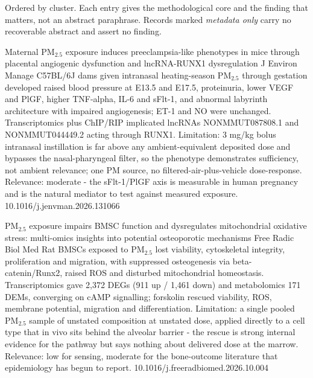 \documentclass[10pt]{article}
\begin{document}
{\fontsize{7.4}{9}\selectfont\color{Slate}Ordered by cluster. Each entry gives the
methodological core and the finding that matters, not an abstract paraphrase. Records
marked \textit{metadata only} carry no recoverable abstract and assert no finding.\par}


{Maternal PM$_{2.5}$ exposure induces preeclampsia-like phenotypes in mice through placental angiogenic dysfunction and lncRNA-RUNX1 dysregulation}
{J Environ Manage}
{C57BL/6J dams given intranasal heating-season PM$_{2.5}$ through gestation developed raised blood pressure at E13.5 and E17.5, proteinuria, lower VEGF and PlGF, higher TNF-alpha, IL-6 and sFlt-1, and abnormal labyrinth architecture with impaired angiogenesis; ET-1 and NO were unchanged. Transcriptomics plus ChIP/RIP implicated lncRNAs NONMMUT087808.1 and NONMMUT044449.2 acting through RUNX1. Limitation: 3 mg/kg bolus intranasal instillation is far above any ambient-equivalent deposited dose and bypasses the nasal-pharyngeal filter, so the phenotype demonstrates sufficiency, not ambient relevance; one PM source, no filtered-air-plus-vehicle dose-response. Relevance: moderate - the sFlt-1/PlGF axis is measurable in human pregnancy and is the natural mediator to test against measured exposure.}
{10.1016/j.jenvman.2026.131066}

\par{}\baselineskip{}\baselineskip
{}

{PM$_{2.5}$ exposure impairs BMSC function and dysregulates mitochondrial oxidative stress: multi-omics insights into potential osteoporotic mechanisms}
{Free Radic Biol Med}
{Rat BMSCs exposed to PM$_{2.5}$ lost viability, cytoskeletal integrity, proliferation and migration, with suppressed osteogenesis via beta-catenin/Runx2, raised ROS and disturbed mitochondrial homeostasis. Transcriptomics gave 2,372 DEGs (911 up / 1,461 down) and metabolomics 171 DEMs, converging on cAMP signalling; forskolin rescued viability, ROS, membrane potential, migration and differentiation. Limitation: a single pooled PM$_{2.5}$ sample of unstated composition at unstated dose, applied directly to a cell type that in vivo sits behind the alveolar barrier - the rescue is strong internal evidence for the pathway but says nothing about delivered dose at the marrow. Relevance: low for sensing, moderate for the bone-outcome literature that epidemiology has begun to report.}
{10.1016/j.freeradbiomed.2026.10.004}
\end{document}
